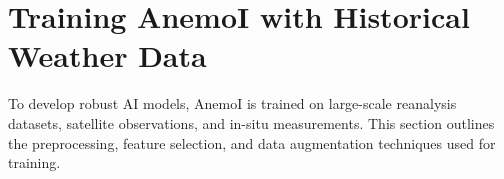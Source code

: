 %
\section{Training AnemoI with Historical Weather Data}
To develop robust AI models, AnemoI is trained on large-scale reanalysis datasets, satellite observations, and in-situ measurements. This section outlines the preprocessing, feature selection, and data augmentation techniques used for training.



